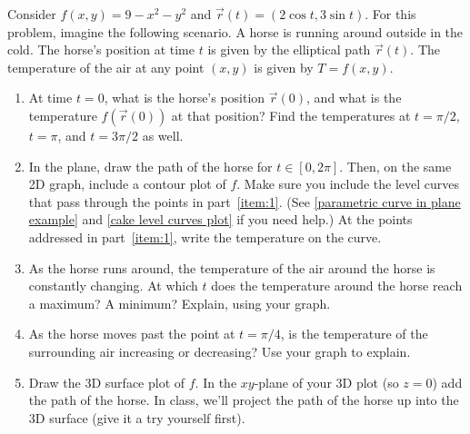 \begin{problem}
 Consider $f(x,y)=9-x^2-y^2$ and $\vec r(t)=(2\cos t, 3\sin t)$. For this problem, imagine the following scenario.  A horse is running around outside in the cold. The horse's position at time $t$ is given by the elliptical path $\vec r(t)$. The temperature of the air at any point $(x,y)$ is given by $T=f(x,y)$.  
\begin{enumerate}
 \item\label{item:1} At time $t=0$, what is the horse's position $\vec r(0)$, and what is the temperature $f(\vec r(0))$ at that position? Find the temperatures at $t=\pi/2$, $t=\pi$, and $t=3\pi/2$ as well. 
 \item In the plane, draw the path of the horse for $t\in [0,2\pi]$. Then, on the same 2D graph, include a contour plot of $f$. Make sure you include the level curves that pass through the points in part~\ref{item:1}. (See  \ref{parametric curve in plane example} and \ref{cake level curves plot} if you need help.) At the points addressed in part~\ref{item:1}, write the temperature on the curve.
 \item{}%
 As the horse runs around, the temperature of the air around the horse is constantly changing. 
At which $t$ does the temperature around the horse reach a maximum?  A minimum?  Explain, using your graph. 
 \item\label{item:2} As the horse moves past the point at $t=\pi/4$, is the temperature of the surrounding air increasing or decreasing? Use your graph to explain.
 \item {}%
Draw the 3D surface plot of $f$. In the $xy$-plane of your 3D plot (so $z=0$) add the path of the horse. In class, we'll project the path of the horse up into the 3D surface (give it a try yourself first). 
\end{enumerate}
\end{problem}

